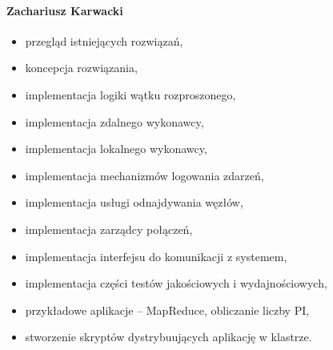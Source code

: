 \paragraph{Zachariusz Karwacki}
\begin{itemize}
\item przegląd istniejących rozwiązań,
\item koncepcja rozwiązania,
\item implementacja logiki wątku rozproszonego,
\item implementacja zdalnego wykonawcy,
\item implementacja lokalnego wykonawcy,
\item implementacja mechanizmów logowania zdarzeń,
\item implementacja usługi odnajdywania węzłów,
\item implementacja zarządcy połączeń,
\item implementacja interfejsu do komunikacji z systemem,
\item implementacja części testów jakościowych i wydajnościowych,
\item przykładowe aplikacje -- MapReduce, obliczanie liczby PI,
\item stworzenie skryptów dystrybuujących aplikację w klastrze.\end{itemize}


